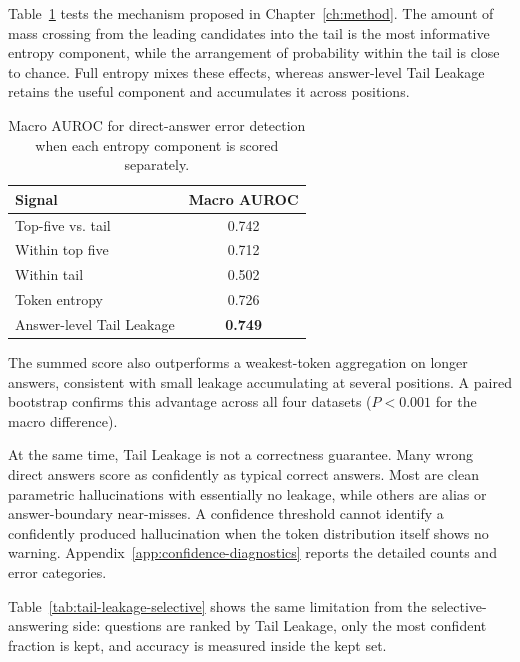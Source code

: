 Table~\ref{tab:entropy-components} tests the mechanism proposed in Chapter~\ref{ch:method}. The amount of mass crossing from the leading candidates into the tail is the most informative entropy component, while the arrangement of probability within the tail is close to chance. Full entropy mixes these effects, whereas answer-level Tail Leakage retains the useful component and accumulates it across positions.

\begin{table}[h]
    \centering
    \caption[Entropy Components and Tail Leakage]{Macro AUROC for direct-answer error detection when each entropy component is scored separately.}
    \label{tab:entropy-components}
    \setlength{\tabcolsep}{7pt}
    \small
    \begin{tabular}{ l c }
        \toprule
        Signal & Macro AUROC \\
        \midrule
        Top-five vs. tail & 0.742 \\
        Within top five & 0.712 \\
        Within tail & 0.502 \\
        Token entropy & 0.726 \\
        Answer-level Tail Leakage & \textbf{0.749} \\
        \bottomrule
    \end{tabular}
\end{table}

The summed score also outperforms a weakest-token aggregation on longer answers, consistent with small leakage accumulating at several positions. A paired bootstrap confirms this advantage across all four datasets ($P<0.001$ for the macro difference).

At the same time, Tail Leakage is not a correctness guarantee. Many wrong direct answers score as confidently as typical correct answers. Most are clean parametric hallucinations with essentially no leakage, while others are alias or answer-boundary near-misses. A confidence threshold cannot identify a confidently produced hallucination when the token distribution itself shows no warning. Appendix~\ref{app:confidence-diagnostics} reports the detailed counts and error categories.

Table~\ref{tab:tail-leakage-selective} shows the same limitation from the selective-answering side: questions are ranked by Tail Leakage, only the most confident fraction is kept, and accuracy is measured inside the kept set.

